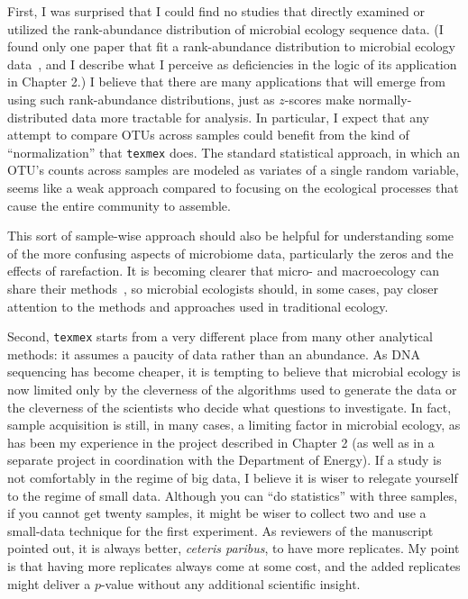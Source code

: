 First, I was surprised that I could find no studies that directly
examined or utilized the rank-abundance distribution of microbial ecology
sequence data. (I found only one paper that fit a rank-abundance distribution to
microbial ecology data~\cite{kembel_incorporating_2012}, and I describe what I
perceive as deficiencies in the logic of its application in Chapter 2.) I
believe that there are many applications that will emerge from using such
rank-abundance distributions, just as $z$-scores make normally-distributed data
more tractable for analysis. In particular, I expect that any attempt to
compare OTUs across samples could benefit from the kind of ``normalization''
that \texttt{texmex} does.
The standard statistical approach, in which an OTU's counts across samples are
modeled as variates of a single random variable, seems like a weak approach
compared to focusing on the ecological processes that cause the entire community
to assemble.

This sort of sample-wise approach should also be helpful for understanding some
of the more confusing aspects of microbiome data, particularly the zeros and
the effects of rarefaction.
It is becoming clearer that micro- and macroecology can share their methods~\cite{hughes_counting_2001},
so microbial ecologists should, in some cases, pay closer attention to the
methods and approaches used in traditional ecology.

Second, \texttt{texmex} starts from a very different place from many other
analytical methods: it assumes a paucity of data rather than an abundance.
As DNA sequencing has become cheaper, it is tempting to believe that microbial
ecology is now limited only by the cleverness of the algorithms used to generate
the data or the cleverness of the scientists who decide what questions to
investigate. In fact, sample acquisition is still, in many cases, a limiting
factor in microbial ecology, as has been my experience in the project described
in Chapter 2 (as well as in a separate project in coordination with the Department
of Energy).
If a study is not comfortably in the regime of
big data, I believe it is wiser to relegate yourself to the regime of small
data. Although you can ``do statistics'' with three samples, if you cannot
get twenty samples, it might be wiser to collect two and use a small-data
technique for the first experiment. As reviewers of the manuscript pointed
out, it is always better, \textit{ceteris paribus}, to have more replicates.
My point is that having more replicates always come at some cost, and the
added replicates might deliver a $p$-value without any additional scientific insight.

